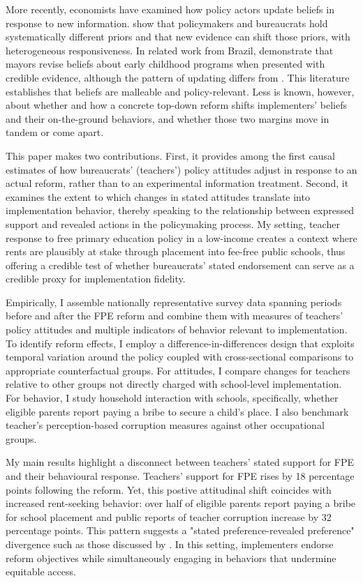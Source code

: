 \documentclass[hidelinks,12pt]{article}
\begin{document}
\begin{singlespace}
More recently, economists have examined how policy actors update beliefs in response to new information. \textcite{vivalt_how_2023} show that policymakers and bureaucrats hold systematically different priors and that new evidence can shift those priors, with heterogeneous responsiveness. In related work from Brazil, \textcite{hjort_how_2021} demonstrate that mayors revise beliefs about early childhood programs when presented with credible evidence, although the pattern of updating differs from \textcite{vivalt_how_2023}. This literature establishes that beliefs are malleable and policy-relevant. Less is known, however, about whether and how a concrete top-down reform shifts implementers’ beliefs and their on-the-ground behaviors, and whether those two margins move in tandem or come apart.

This paper makes two contributions. First, it provides among the first causal estimates of how bureaucrats’ (teachers’) policy attitudes adjust in response to an actual reform, rather than to an experimental information treatment. Second, it examines the extent to which changes in stated attitudes translate into implementation behavior, thereby speaking to the relationship between expressed support and revealed actions in the policymaking process. My setting, teacher response to free primary education policy in a low-income creates a context where rents are plausibly at stake through placement into fee-free public schools, thus offering a credible test of whether bureaucrats’ stated endorsement can serve as a credible proxy for implementation fidelity.

Empirically, I assemble nationally representative survey data spanning periods before and after the FPE reform and combine them with measures of teachers’ policy attitudes and multiple indicators of behavior relevant to implementation. To identify reform effects, I employ a difference-in-differences design that exploits temporal variation around the policy coupled with cross-sectional comparisons to appropriate counterfactual groups. For attitudes, I compare changes for teachers relative to other groups not directly charged with school-level implementation. For behavior, I study household interaction with schools, specifically, whether eligible parents report paying a bribe to secure a child’s place. I also benchmark teacher's perception-based corruption measures against other occupational groups. 

My main results highlight a disconnect between teachers’ stated support for FPE and their behavioural response. Teachers’ support for FPE rises by 18 percentage points following the reform. Yet, this postive attitudinal shift coincides with increased rent-seeking behavior: over half of eligible parents report paying a bribe for school placement and public reports of teacher corruption increase by 32 percentage points. This pattern suggests a "stated preference-revealed preference" divergence such as those discussed by \textcite{beshears_how_2008}. In this setting, implementers endorse reform objectives while simultaneously engaging in behaviors that undermine equitable access.


\end{singlespace}
\end{document}
